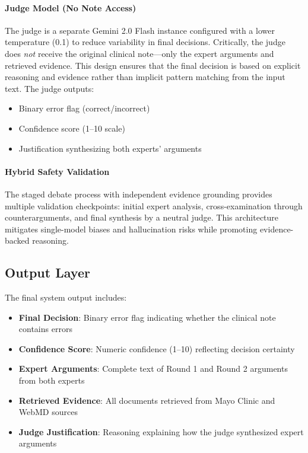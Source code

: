 \documentclass[11pt]{article}
\begin{document}
\paragraph{Judge Model (No Note Access)}
The judge is a separate Gemini 2.0 Flash instance configured with a lower temperature (0.1) to reduce variability in final decisions. Critically, the judge does \emph{not} receive the original clinical note—only the expert arguments and retrieved evidence. This design ensures that the final decision is based on explicit reasoning and evidence rather than implicit pattern matching from the input text. The judge outputs:
\begin{itemize}
    \item Binary error flag (correct/incorrect)
    \item Confidence score (1--10 scale)
    \item Justification synthesizing both experts' arguments
\end{itemize}

\paragraph{Hybrid Safety Validation}
The staged debate process with independent evidence grounding provides multiple validation checkpoints: initial expert analysis, cross-examination through counterarguments, and final synthesis by a neutral judge. This architecture mitigates single-model biases and hallucination risks while promoting evidence-backed reasoning.

\subsection{Output Layer}

The final system output includes:
\begin{itemize}
    \item \textbf{Final Decision}: Binary error flag indicating whether the clinical note contains errors
    \item \textbf{Confidence Score}: Numeric confidence (1--10) reflecting decision certainty
    \item \textbf{Expert Arguments}: Complete text of Round 1 and Round 2 arguments from both experts
    \item \textbf{Retrieved Evidence}: All documents retrieved from Mayo Clinic and WebMD sources
    \item \textbf{Judge Justification}: Reasoning explaining how the judge synthesized expert arguments
\end{itemize}
\end{document}
